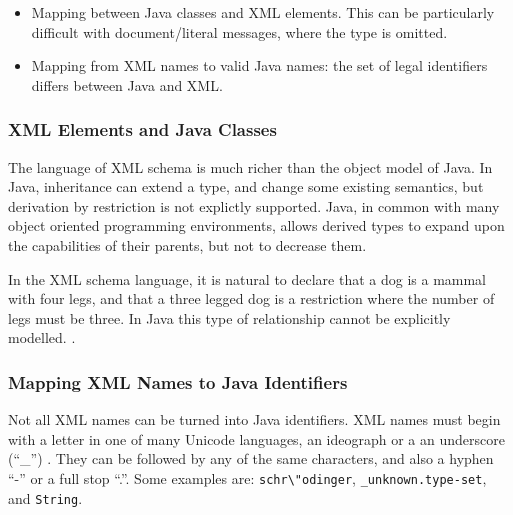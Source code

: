 
\begin{itemize}

\item Mapping between Java classes and XML elements. This can be
particularly difficult with document/literal messages, where the type
is omitted.

\item Mapping from XML names to valid Java names: the set of legal
identifiers differs between Java and XML.

\end{itemize}

\subsubsection{XML Elements and Java Classes}
\label{objections:o-x:xml-classes}

The language of XML schema is much richer than the object model of
Java. In Java, inheritance can extend a type, and change some existing
semantics, but derivation by restriction is not explictly
supported. Java, in common with many object oriented programming
environments, allows derived types to expand upon the capabilities of
their parents, but not to decrease them.

In the XML schema language, it is natural to declare that a dog is a
mammal with four legs, and that a three legged dog is a restriction
where the number of legs must be three. In Java this type of
relationship cannot be explicitly modelled. .


\subsubsection{Mapping XML Names to Java Identifiers}
\label{objections:o-x:names}


Not all XML names can be turned into Java identifiers. 
XML names must begin with a letter in one of many Unicode languages,
an ideograph or a an underscore (``\_'') . They can be followed by any of the same
characters, and also a hyphen ``-'' or a full stop ``.''. Some examples
are: \verb|schr\"odinger|, \verb|_unknown.type-set|, and \verb|String|.

